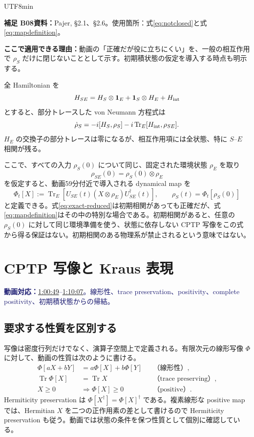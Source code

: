 \documentclass[11pt,a4paper]{article}
\numberwithin{equation}{section}
\newcommand{\Tr}{\operatorname{Tr}}
\newcommand{\I}{\mathbf{1}}
\newcommand{\vid}[2]{\href{https://www.youtube.com/watch?v=3gDSaNy1O7Y\&t=#1s}{#2}}
\newcommand{\source}[1]{\par\noindent\textcolor{MidnightBlue}{\textbf{動画対応：}#1}\par}
\newcommand{\supp}[3]{\par\smallskip\noindent\textcolor{BrickRed}{\textbf{補足 #1}}\quad\textbf{資料：}#2\par\noindent\textbf{ここで適用できる理由：}#3\par}
\begin{document}
\begin{CJK*}{UTF8}{min}
\supp{B08}{Pajer\cite{pajer}, §2.1、§2.6。使用箇所：式\eqref{eq:notclosed}と式\eqref{eq:mapdefinition}。}{動画の「正確だが役に立ちにくい」を、一般の相互作用で $\rho_S$ だけに閉じないこととして示す。初期積状態の仮定を導入する時点も明示する。}
全 Hamiltonian を
\begin{equation}
H_{SE}=H_S\otimes\I_E+\I_S\otimes H_E+H_{\rm int}
\label{eq:totalhamiltonian}
\end{equation}
とすると、部分トレースした von Neumann 方程式は
\begin{equation}
\dot\rho_S=-i[H_S,\rho_S]-i\Tr_E[H_{\rm int},\rho_{SE}].
\label{eq:notclosed}
\end{equation}
$H_E$ の交換子の部分トレースは零になるが、相互作用項には全状態、特に $S$--$E$ 相関が残る。

ここで、すべての入力 $\rho_S(0)$ について同じ、固定された環境状態 $\rho_E$ を取り
\begin{equation}
\rho_{SE}(0)=\rho_S(0)\otimes\rho_E
\label{eq:initial-factorized}
\end{equation}
を仮定すると、動画59分付近で導入される dynamical map を
\begin{equation}
\Phi_t[X]:=\Tr_E[U_{SE}(t)(X\otimes\rho_E)U_{SE}^\dagger(t)],
\qquad \rho_S(t)=\Phi_t[\rho_S(0)]
\label{eq:mapdefinition}
\end{equation}
と定義できる。式\eqref{eq:exact-reduced}は初期相関があっても正確だが、式\eqref{eq:mapdefinition}はその中の特別な場合である。初期相関があると、任意の $\rho_S(0)$ に対して同じ環境準備を使う、状態に依存しない CPTP 写像をこの式から得る保証はない。初期相関のある物理系が禁止されるという意味ではない。

\section{CPTP 写像と Kraus 表現}
\label{sec:channels}
\source{\vid{3649}{1:00:49}--\vid{4207}{1:10:07}。線形性、trace preservation、positivity、complete positivity、初期積状態からの帰結。}
\subsection{要求する性質を区別する}
写像は密度行列だけでなく、演算子空間上で定義される。有限次元の線形写像 $\Phi$ に対して、動画の性質は次のように書ける。
\begin{align}
\Phi[aX+bY]&=a\Phi[X]+b\Phi[Y] &&\text{（線形性）},\\
\Tr\Phi[X]&=\Tr X &&\text{（trace preserving）},\\
X\geq0&\Longrightarrow\Phi[X]\geq0 &&\text{（positive）}.
\end{align}
Hermiticity preservation は $\Phi[X^\dagger]=\Phi[X]^\dagger$ である。複素線形な positive map では、Hermitian $X$ を二つの正作用素の差として書けるので Hermiticity preservation も従う。動画では状態の条件を保つ性質として個別に確認している。


\end{CJK*}
\end{document}

